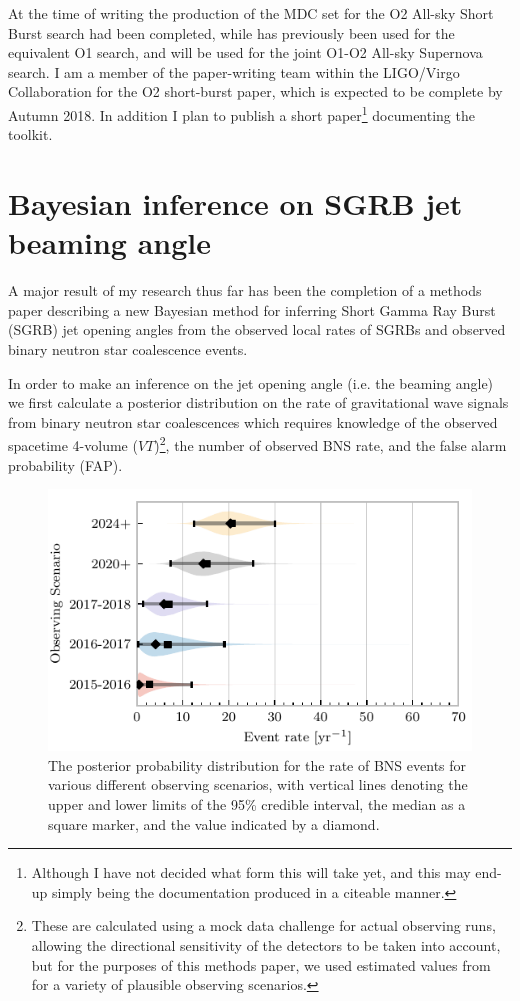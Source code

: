 \documentclass{kentigern}
\theoremstyle{definition}
\begin{document}
At the time of writing the production of the MDC set for the O2
All-sky Short Burst search had been completed, while \minke{} has
previously been used for the equivalent O1 search, and will be used
for the joint O1-O2 All-sky Supernova search. I am a member of the
paper-writing team within the LIGO/Virgo Collaboration for the O2
short-burst paper, which is expected to be complete by Autumn 2018. In
addition I plan to publish a short paper\footnote{Although I have not
  decided what form this will take yet, and this may end-up simply
  being the documentation produced in a citeable manner.} documenting
the \minke{} toolkit.

\section{Bayesian inference on SGRB jet beaming angle}

A major result of my research thus far has been the completion of a
methods paper\cite{2017arXiv171202585W} describing a new Bayesian method for inferring Short
Gamma Ray Burst (SGRB) jet opening angles from the observed local
rates of SGRBs and observed binary neutron star coalescence events.



In order to make an inference on the jet opening angle (i.e. the
beaming angle) we first calculate a posterior distribution on the rate of
gravitational wave signals from binary neutron star coalescences which
requires knowledge of the observed spacetime 4-volume
($VT$)\footnote{These are calculated using a mock data challenge for
  actual observing runs, allowing the directional sensitivity of the
  detectors to be taken into account, but for the purposes of this
  methods paper, we used estimated values from
  \cite{observingscenarios} for a variety of plausible observing
  scenarios.}, the number of observed BNS rate, and the false alarm
probability (FAP).

\begin{figure}[b]
  \includegraphics{figures/sgrb/rate_posteriors_violin.pdf}
  \caption{The posterior probability distribution for the
    rate of BNS events for various different observing scenarios, with
    vertical lines denoting the upper and lower limits of the 95\%
    credible interval, the median as a square marker, and the
    \map{}value indicated by a diamond. \label{fig:rateposteriors}}
\end{figure}
\end{document}
